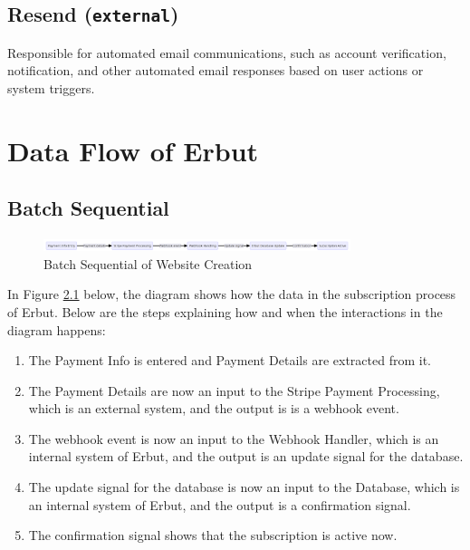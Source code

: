 \documentclass[a4paper]{report}
\begin{document}
\section{Resend (\texttt{external})}

Responsible for automated email communications, such as account verification, notification, and other automated email responses based on user actions or system triggers.

\chapter{Data Flow of Erbut}

\section{Batch Sequential}

\begin{figure}[h!]
    \centering
    \includegraphics[width=0.8\textwidth]{images/data-flow/user-subscription-batch-sequential.png}
    \caption{Batch Sequential of Website Creation}
    \label{fig:batch-sequential-user-subscription}
\end{figure}

In Figure \ref{fig:batch-sequential-user-subscription} below, the diagram shows how the data in the subscription process of Erbut. Below are the steps explaining how and when the interactions in the diagram happens:

\begin{enumerate}
    \item The Payment Info is entered and Payment Details are extracted from it.
    \item The Payment Details are now an input to the Stripe Payment Processing, which is an external system, and the output is is a webhook event.
    \item The webhook event is now an input to the Webhook Handler, which is an internal system of Erbut, and the output is an update signal for the database.
    \item The update signal for the database is now an input to the Database, which is an internal system of Erbut, and the output is a confirmation signal.
    \item The confirmation signal shows that the subscription is active now.
\end{enumerate}
\end{document}

